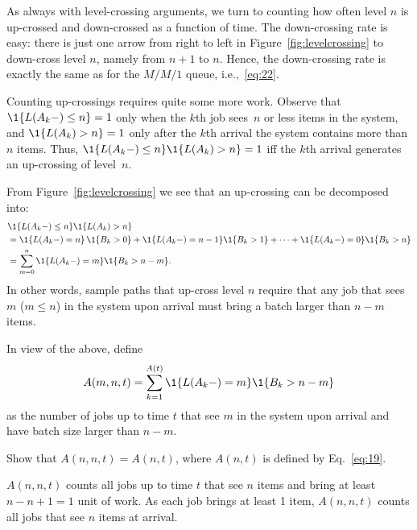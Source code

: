 As always with level-crossing arguments, we turn to counting how often level $n$ is up-crossed and down-crossed as a function of time.
The down-crossing rate is easy: there is just one arrow from right to left in Figure~\ref{fig:levelcrossing} to down-cross level $n$, namely from $n+1$ to $n$.
Hence, the down-crossing rate is exactly the same as for the $M/M/1$ queue, i.e.,~\eqref{eq:22}.

Counting up-crossings requires quite some more work.
Observe that $\1{L(A_k-)\leq n}=1$ only when the $k$th job sees~$n$ or less items in the system, and $\1{L(A_k) > n}=1$ only after the $k$th arrival the system contains more than $n$ items.
Thus, $\1{L(A_k-) \leq n}\1{ L(A_k)>n}=1$ iff the $k$th arrival generates an up-crossing of level~$n$.



From Figure~\ref{fig:levelcrossing} we see that an up-crossing can be decomposed into:
\begin{equation*}
  \begin{split}
&\1{L(A_k-) \leq n}\1{L(A_k)>n}  \\
&=  \1{L(A_k-) =n}\, \1{B_k >0} + \1{L(A_k-) =n-1}\1{ B_k >1} +\cdots + \1{L(A_k-) =0}\1{B_k > n} \\
&= \sum_{m=0}^n \1{L(A_k-) =m}\1{B_k > n-m}.
  \end{split}
\end{equation*}
In other words, sample paths that up-cross level $n$ require that any job that
sees $m$ ($m\leq n$) in the system upon arrival must bring a batch larger
than $n-m$ items.

In view of the above, define 
\begin{equation*}
  A(m,n,t) = \sum_{k=1}^{A(t)}\1{L(A_k-) = m}\1{B_k > n-m}
\end{equation*}
as the number of jobs up to time $t$ that see $m$ in the system upon
arrival and have batch size larger than $n-m$. 

\begin{exercise}[\faFlask]
   Show that $A(n, n,t) = A(n,t)$, where $A(n,t)$ is defined by Eq.~\eqref{eq:19}.
\begin{solution}
 $A(n,n,t)$ counts all jobs up to time $t$ that see $n$ items
    and bring at least $n-n+1=1$ unit of work. As each job brings at
    least 1 item, $A(n,n,t)$ counts all jobs that see $n$ items at
    arrival.
\end{solution}
\end{exercise}

